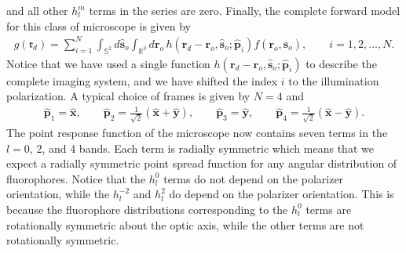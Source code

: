 \documentclass[11pt]{article}
\providecommand{\ro}[1]{\mathbf{\mathbf{r}}_o}
\providecommand{\so}[1]{\mathbf{\hat{s}}_o}
\providecommand{\rd}[1]{\mathbf{r}_d}
\providecommand{\mh}[1]{\mathbf{\hat{#1}}}
\providecommand{\mbb}[1]{\mathbb{#1}}
\begin{document}
and all other $h_l^m$ terms in the series are zero. Finally, the complete
forward model for this class of microscope is given by
\begin{align}
    g(\mathfrak{r}_d) = \sum_{i=1}^N\int_{\mbb{S}^2}d\so{}\int_{\mbb{R}^3}d\ro{}\, h(\rd{} - \ro{}, \so{}; \mh{p}_i)f(\ro{}, \so{}),\qquad i=1, 2,\ldots,N. \label{eq:fwdpolillum}
\end{align}
Notice that we have used a single function $h(\rd{} - \ro{}, \so{}; \mh{p}_i)$
to describe the complete imaging system, and we have shifted the index $i$ to
the illumination polarization. A typical choice of frames is given by $N=4$ and
\begin{align}
  \mh{p}_1 = \mh{x},\hspace{2em}
  \mh{p}_2 = \frac{1}{\sqrt{2}}(\mh{x} + \mh{y}),\hspace{2em}
  \mh{p}_3 = \mh{y},\hspace{2em}
  \mh{p}_4 = \frac{1}{\sqrt{2}}(\mh{x} - \mh{y}). 
\end{align}
\indent The point response function of the microscope now contains seven terms
in the $l=0$, 2, and 4 bands. Each term is radially symmetric which means that
we expect a radially symmetric point spread function for any angular
distribution of fluorophores. Notice that the $h_l^0$ terms do not depend on the
polarizer orientation, while the $h_l^{-2}$ and $h_l^{2}$ do depend on the
polarizer orientation. This is because the fluorophore distributions
corresponding to the $h_l^0$ terms are rotationally symmetric about the optic
axis, while the other terms are not rotationally symmetric.
\end{document}

